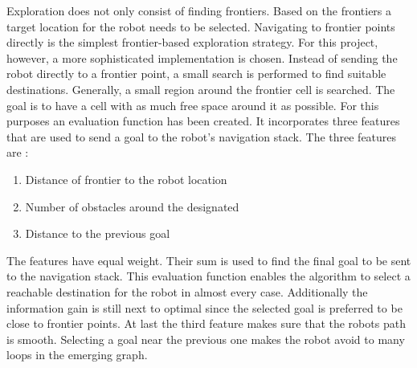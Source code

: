 \documentclass{ba-kecs}
\begin{document}
Exploration does not only consist of finding frontiers. Based on the frontiers a target location for the robot needs to be selected. Navigating to frontier points directly is the simplest frontier-based exploration strategy. For this project, however, a more sophisticated implementation is chosen. Instead of sending the robot directly to a frontier point, a small search is performed to find suitable destinations. Generally, a small region around the frontier cell is searched. The goal is to have a cell with as much free space around it as possible. For this purposes an evaluation function has been created. It incorporates three features that are used to send a goal to the robot's navigation stack. The three features are :
\begin{enumerate}
\item{Distance of frontier to the robot location}
\item{Number of obstacles around the designated} \item{Distance to the previous goal}
\end{enumerate}
 The features have equal weight. Their sum is used to find the final goal to be sent to the navigation stack. This evaluation function enables the algorithm to select a reachable destination for the robot in almost every case. Additionally the information gain is still next to optimal since the selected goal is preferred to be close to frontier points. At last the third feature makes sure that the robots path is smooth. Selecting a goal near the previous one makes the robot avoid to many loops in the emerging graph.
\end{document}
